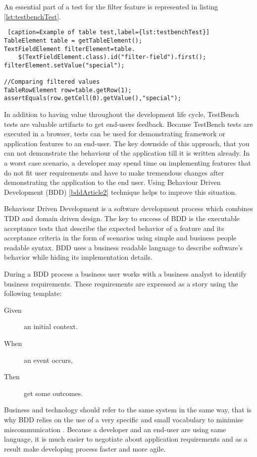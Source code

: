 An essential  part of a test for the filter feature is represented in listing
\ref{lst:testbenchTest}. 

 \lstset{style=a1listing}
  \begin{lstlisting} [caption=Example of table test,label={lst:testbenchTest}]
TableElement table = getTableElement();
TextFieldElement filterElement=table.
	$(TextFieldElement.class).id("filter-field").first();
filterElement.setValue("special");

//Comparing filtered values
TableRowElement row=table.getRow(1);
assertEquals(row.getCell(0).getValue(),"special");
  \end{lstlisting}

In addition to having value throughout the development life cycle,
TestBench tests are valuable artifacts to get end-users feedback.
Because TestBench tests are executed in a browser, tests can be used 
for demonstrating framework or application features to an end-user. The key
downside of this approach, that you can not demonstrate the behaviour of the
application till it is written already. In a worst case scenario, a developer
may spend time on implementing features that do not fit user requirements and
have to make tremendous changes after demonstrating the application to the end
user. Using Behaviour Driven Development (BDD) \ref{bddArticle2} technique helps
to improve this situation.

Behaviour Driven Development is a software development process which combines
TDD and domain driven design. The key to success of BDD is the executable
acceptance tests that describe the expected behavior of a feature and its
acceptance criteria in the form of scenarios using simple and
business people readable syntax\cite{bddArticle}. BDD uses a business readable
language to describe software's behavior while hiding its implementation
details.

During a BDD process a business user works with a business analyst
to identify business requirements. These requirements are expressed as a story
using the following template:

\begin{description}
  \item[Given] an initial context.
  \item[When] an event occurs,
  \item[Then] get some outcomes. 
\end{description}

Business and technology should refer to the same system in the same way, that is
why BDD relies on the use of a very specific and small vocabulary to minimise miscommunication \cite{bddWebSite}.
Because a developer and an end-user are using same language, it is much easier
to negotiate about application requirements and as a result make developing
process faster and more agile.

